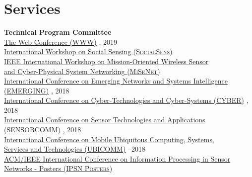 
\section{\sc Services}
{\bf Technical Program Committee}\\
{\href{https://www2019.thewebconf.org/}{The Web Conference (\textsc{WWW})}} , 2019\\
{\href{https://www.cse.buffalo.edu/~lusu/SocialSens2018/}{International Workshop on Social Sensing (\textsc{SocialSens})}} \\
{\href{http://infocom2018.ieee-infocom.org/content/workshop-misenet-mission-oriented-wireless-sensor-networking}{IEEE International Workshop on Mission-Oriented Wireless Sensor \\\mbox{\hspace{0.6cm}} and Cyber-Physical System Networking (\textsc{MiSeNet})}} \\
{\href{http://www.iaria.org/conferences2018/EMERGING18.html}{International Conference on Emerging Networks and Systems Intelligence \\\mbox{\hspace{0.6cm}} (\textsc{EMERGING})}} , 2018\\
{\href{http://www.iaria.org/conferences2018/CYBER18.html}{International Conference on Cyber-Technologies and Cyber-Systems (\textsc{CYBER})}} , 2018\\
{\href{http://www.iaria.org/conferences2018/SENSORCOMM18.html}{International Conference on Sensor Technologies and Applications \\\mbox{\hspace{0.6cm}} (\textsc{SENSORCOMM})}} , 2018\\
{\href{http://www.iaria.org/conferences2018/UBICOMM18.html}{International Conference on Mobile Ubiquitous Computing, Systems,\\\mbox{\hspace{0.6cm}} Services and Technologies (\textsc{UBICOMM})}} --2018\\
{\href{http://ipsn.acm.org/2016/posters.html}{ACM/IEEE International Conference on Information Processing in Sensor\\\mbox{\hspace{0.6cm}} Networks - Posters (\textsc{IPSN Posters})}} \\
\vspace{-0.6cm}

